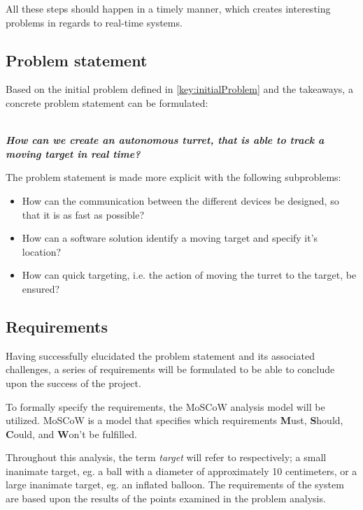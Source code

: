 All these steps should happen in a timely manner, which creates interesting problems in regards to real-time systems.

\subsection{Problem statement}
Based on the initial problem defined in \autoref{key:initialProblem} and the takeaways, a concrete problem statement can be formulated:\\~\\

\begin{center}
	\textit{\textbf{\large{How can we create an autonomous turret, that is able to track a moving target in real time?}}}
\end{center}

The problem statement is made more explicit with the following subproblems:
\begin{center}
	\begin{itemize}
		\item How can the communication between the different devices be designed, so that it is as fast as possible?
		\item How can a software solution identify a moving target and specify it's location?
		\item How can quick targeting, i.e. the action of moving the turret to the target, be ensured?
	\end{itemize}
\end{center}


\subsection{Requirements}\label{subsec:requirements}
Having successfully elucidated the problem statement and its associated challenges, a series of requirements will be formulated to be able to conclude upon the success of the project.

To formally specify the requirements, the MoSCoW analysis model will be utilized.
MoSCoW is a model that specifies which requirements \textbf{M}ust, \textbf{S}hould, \textbf{C}ould, and \textbf{W}on't be fulfilled.

Throughout this analysis, the term \textit{target} will refer to respectively; a small inanimate target, eg{.} a ball with a diameter of approximately 10 centimeters, or a large inanimate target, eg{.} an inflated balloon.
The requirements of the system are based upon the results of the points examined in the problem analysis.

